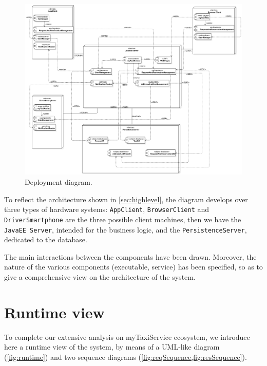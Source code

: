 \begin{figure}%
	\centering%
	\includegraphics[width=\linewidth]{img/Deploy__DeploymentDiagram_4}%
	\caption{Deployment diagram.}\label{fig:deployment}%
\end{figure}

To reflect the architecture shown in \cref{sec:highlevel}, the diagram develops over three types of hardware systems: \texttt{App\-Cli\-ent}, \texttt{Brows\-er\-Cli\-ent} and \texttt{Driver\-Smart\-phone} are the three possible client machines, then we have the \texttt{Java\-EE Ser\-ver}, intended for the business logic, and the \texttt{Per\-sist\-ence\-Ser\-ver}, dedicated to the database.

The main interactions between the components have been drawn. Moreover, the nature of the various components (executable, service) has been specified, so as to give a comprehensive view on the architecture of the system.












\clearpage%
\section{Runtime view}\label{sec:runtime}
To complete our extensive analysis on myTaxiService ecosystem, we introduce here a runtime view of the system, by means of a \mbox{UML-like} diagram (\cref{fig:runtime}) and two sequence diagrams (\cref{fig:reqSequence,fig:resSequence}).

